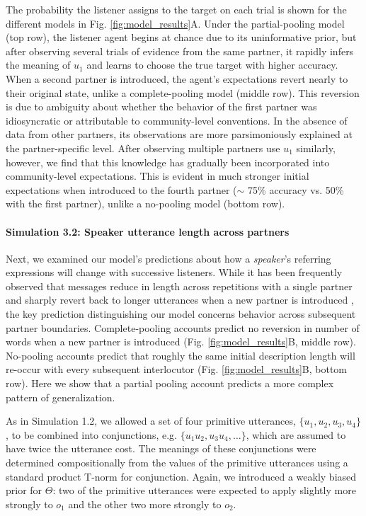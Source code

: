 The probability the listener assigns to the target on each trial is shown for the different models in Fig. \ref{fig:model_results}A.
Under the partial-pooling model (top row), the listener agent begins at chance due to its uninformative prior, but after observing several trials of evidence from the same partner, it rapidly infers the meaning of $u_1$ and learns to choose the true target with higher accuracy.
When a second partner is introduced, the agent's expectations revert nearly to their original state, unlike a complete-pooling model (middle row).
This reversion is due to ambiguity about whether the behavior of the first partner was idiosyncratic or attributable to community-level conventions.
In the absence of data from other partners, its observations are more parsimoniously explained at the partner-specific level.
After observing multiple partners use $u_1$ similarly, however, we find that this knowledge has gradually been incorporated into community-level expectations. 
This is evident in much stronger initial expectations when introduced to the fourth partner ($\sim$ 75\% accuracy vs. 50\% with the first partner), unlike a no-pooling model (bottom row).

\paragraph{Simulation 3.2: Speaker utterance length across partners}

Next, we examined our model's predictions about how a \emph{speaker}'s referring expressions will change with successive listeners.
While it has been frequently observed that messages reduce in length across repetitions with a single partner \cite{krauss_changes_1964} and sharply revert back to longer utterances when a new partner is introduced \cite{wilkes-gibbs_coordinating_1992}, the key prediction distinguishing our model concerns behavior across subsequent partner boundaries.
Complete-pooling accounts predict no reversion in number of words when a new partner is introduced  (Fig. \ref{fig:model_results}B, middle row).
No-pooling accounts predict that roughly the same initial description length will re-occur with every subsequent interlocutor  (Fig. \ref{fig:model_results}B, bottom row). 
Here we show that a partial pooling account predicts a more complex pattern of generalization.

As in Simulation 1.2, we allowed a set of four primitive utterances, $\{u_1, u_2, u_3, u_4\}$, to be combined into conjunctions, e.g. $\{u_1u_2, u_3u_4, \dots\}$, which are assumed to have twice the utterance cost.
The meanings of these conjunctions were determined compositionally from the values of the primitive utterances using a standard product T-norm for conjunction. 
Again, we introduced a weakly biased prior for $\Theta$: two of the primitive utterances were expected to apply slightly more strongly to $o_1$ and the other two more strongly to $o_2$.

